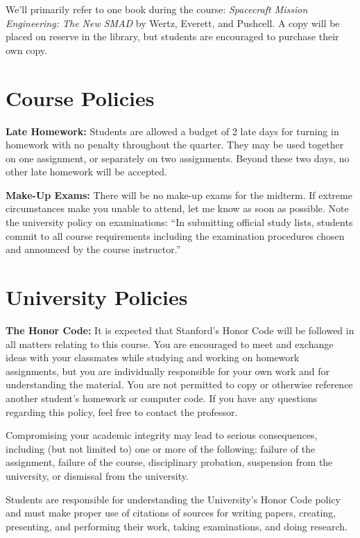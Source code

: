 \documentclass[11pt,letterpaper]{article}
\begin{document}
We'll primarily refer to one book during the course: \textit{Spacecraft Mission Engineering: The New SMAD} by Wertz, Everett, and Pushcell. A copy will be placed on reserve in the library, but students are encouraged to purchase their own copy.

\section*{Course Policies}

\textbf{Late Homework:} Students are allowed a budget of 2 late days for turning in homework with no penalty throughout the quarter. They may be used together on one assignment, or separately on two assignments. Beyond these two days, no other late homework will be accepted.

\medskip
\noindent
\textbf{Make-Up Exams:} There will be no make-up exams for the midterm. If extreme circumstances make you unable to attend, let me know as soon as possible. Note the university policy on examinations: ``In submitting official study lists, students commit to all course requirements including the examination procedures chosen and announced by the course instructor.''

\section*{University Policies}

\textbf{The Honor Code:} It is expected that Stanford's Honor Code will be followed in all matters relating to this course. You are encouraged to meet and exchange ideas with your classmates while studying and working on homework assignments, but you are individually responsible for your own work and for understanding the material. You are not permitted to copy or otherwise reference another student's homework or computer code. If you have any questions regarding this policy, feel free to contact the professor.

Compromising your academic integrity may lead to serious consequences, including (but not limited to) one or more of the following: failure of the assignment, failure of the course, disciplinary probation, suspension from the university, or dismissal from the university.

Students are responsible for understanding the University's Honor Code policy and must make proper use of citations of sources for writing papers, creating, presenting, and performing their work, taking examinations, and doing research.
\end{document}
